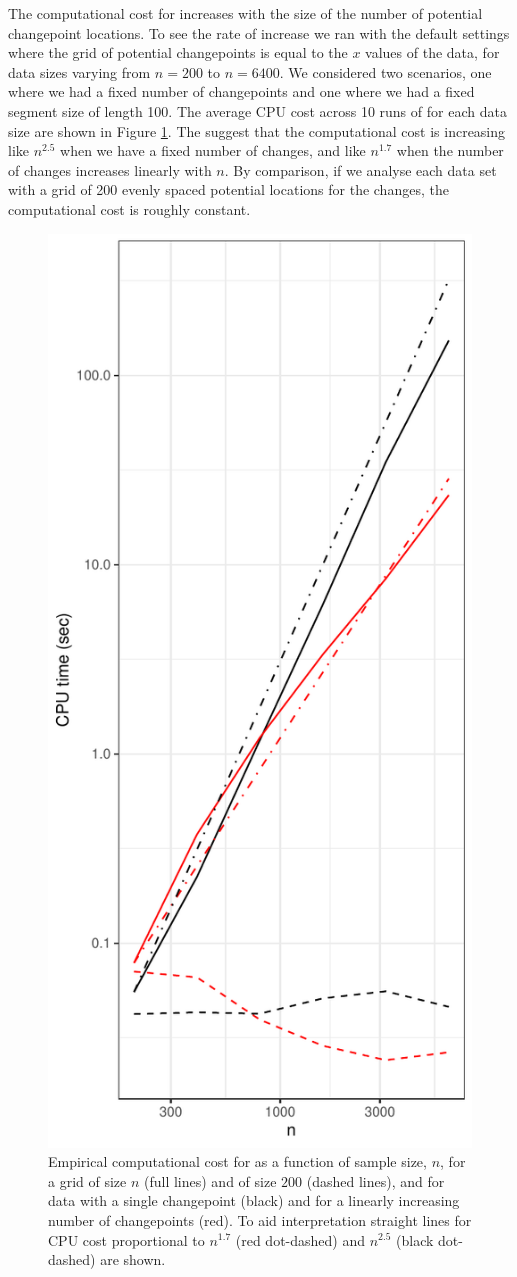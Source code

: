 \documentclass[article]{jss}
\begin{document}
The computational cost for  increases with the size of the number of potential changepoint locations. To see the rate of increase we ran  with the default settings where the grid of potential changepoints is equal to the $x$ values of the data, for data sizes varying from $n=200$ to $n=6400$. We considered two scenarios, one where we had a fixed number of changepoints and one where we had a fixed segment size of length 100. The average CPU cost across 10 runs of  for each data size are shown in Figure \ref{fig:cpop-CPU}. The suggest that the computational cost is increasing like $n^{2.5}$ when we have a fixed number of changes, and like $n^{1.7}$ when the number of changes increases linearly with $n$. By comparison, if we analyse each data set with a grid of 200 evenly spaced potential locations for the changes, the computational cost is roughly constant.

\begin{figure}
\centering
\includegraphics[width=0.6\linewidth]{figures/cpop_CPU_ggplot.pdf}
\caption{Empirical computational cost for  as a function of sample size, $n$, for a grid of size $n$ (full lines) and of size $200$ (dashed lines), and for data with a single changepoint (black) and for a linearly increasing number of changepoints (red). To aid interpretation straight lines for CPU cost proportional to $n^{1.7}$ (red dot-dashed) and $n^{2.5}$ (black dot-dashed) are shown.}
\label{fig:cpop-CPU}
\end{figure}
\end{document}
